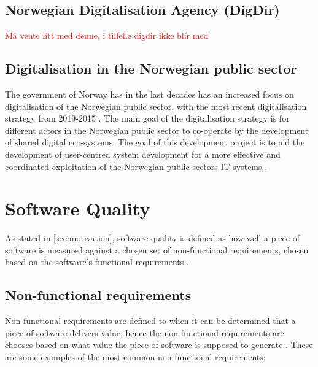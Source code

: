 \subsection{Norwegian Digitalisation Agency (DigDir)}
\textcolor{red}{Må vente litt med denne, i tilfelle digdir ikke blir med}

\subsection{Digitalisation in the Norwegian public sector}
The government of Norway has in the last decades has an increased focus on digitalisation of the Norwegian public sector, with the most recent digitalisation strategy from 2019-2015 \cite{r_2019}. The main goal of the digitalisation strategy is for different actors in the Norwegian public sector to co-operate by the development of shared digital eco-systems. The goal of this development project is to aid the development of user-centred system development for a more effective and coordinated exploitation of the Norwegian public sectors IT-systems \cite{r_2019}.

\section{Software Quality}
As stated in \autoref{sec:motivation}, software quality is defined as how well a piece of software is measured against a chosen set of non-functional requirements, chosen based on the software's functional requirements \cite{iso_25010:2011}. 

\subsection{Non-functional requirements} \label{sec:non_functional_requirments}
Non-functional requirements are defined to when it can be determined that a piece of software delivers value, hence the non-functional requirements are chooses based on what value the piece of software is supposed to generate \cite{iso_25010:2011}. These are some examples of the most common non-functional requirements:

